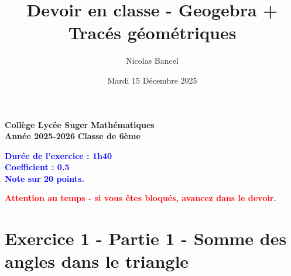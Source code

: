\documentclass[answers]{exam}
\title{Devoir en classe - Geogebra + Tracés géométriques}
\author{Nicolas Bancel}
\date{Mardi 15 Décembre 2025}
\begin{document}
\textbf{Collège Lycée Suger}
\hfill
\textbf{Mathématiques} \\

\textbf{Année 2025-2026}
\hfill
\textbf{Classe de 6ème} \par

{\let\newpage\relax\maketitle}

\begin{tcolorbox}[
  colframe=blue!90!black,
  fonttitle=\bfseries,
  boxsep=4pt,
  sharp corners
]
\begin{center}
\textbf{\textcolor{blue}{Durée de l'exercice : 1h40 \\
Coefficient : 0.5 \\
Note sur 20 points.
}}
\end{center}
\end{tcolorbox}

\vspace{0.3em}

\begin{center}
  \textbf{\textcolor{red}{Attention au temps - si vous êtes bloqués, avancez dans le devoir.}}
\end{center}


\section*{Exercice 1 - Partie 1 - Somme des angles dans le triangle}
\end{document}
